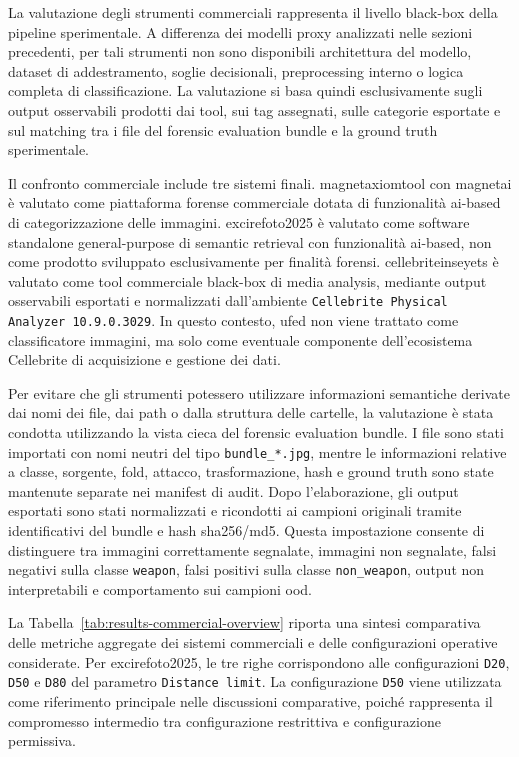 La valutazione degli strumenti commerciali rappresenta il livello black-box della
pipeline sperimentale. A differenza dei modelli proxy analizzati nelle sezioni
precedenti, per tali strumenti non sono disponibili architettura del modello,
dataset di addestramento, soglie decisionali, preprocessing interno o logica
completa di classificazione. La valutazione si basa quindi esclusivamente sugli
output osservabili prodotti dai tool, sui tag assegnati, sulle categorie esportate
e sul matching tra i file del forensic evaluation bundle e la ground truth
sperimentale.

Il confronto commerciale include tre sistemi finali. \gls{magnetaxiomtool} con
\gls{magnetai} è valutato come piattaforma forense commerciale dotata di
funzionalità \gls{ai}-based di categorizzazione delle immagini.
\gls{excirefoto2025} è valutato come software standalone general-purpose di
semantic retrieval con funzionalità \gls{ai}-based, non come prodotto sviluppato
esclusivamente per finalità forensi. \gls{cellebriteinseyets} è valutato come
tool commerciale black-box di media analysis, mediante output osservabili
esportati e normalizzati dall'ambiente \texttt{Cellebrite Physical Analyzer
10.9.0.3029}. In questo contesto, \gls{ufed} non viene trattato come
classificatore immagini, ma solo come eventuale componente dell'ecosistema
Cellebrite di acquisizione e gestione dei dati.

Per evitare che gli strumenti potessero utilizzare informazioni semantiche
derivate dai nomi dei file, dai path o dalla struttura delle cartelle, la
valutazione è stata condotta utilizzando la vista cieca del forensic evaluation
bundle. I file sono stati importati con nomi neutri del tipo
\texttt{bundle\_*.jpg}, mentre le informazioni relative a classe, sorgente, fold,
attacco, trasformazione, hash e ground truth sono state mantenute separate nei
manifest di audit. Dopo l'elaborazione, gli output esportati sono stati
normalizzati e ricondotti ai campioni originali tramite identificativi del bundle
e hash \gls{sha256}/\gls{md5}. Questa impostazione consente di distinguere tra
immagini correttamente segnalate, immagini non segnalate, falsi negativi sulla
classe \texttt{weapon}, falsi positivi sulla classe \texttt{non\_weapon}, output
non interpretabili e comportamento sui campioni \gls{ood}.

La Tabella~\ref{tab:results-commercial-overview} riporta una sintesi comparativa
delle metriche aggregate dei sistemi commerciali e delle configurazioni
operative considerate. Per \gls{excirefoto2025}, le tre righe corrispondono alle
configurazioni \texttt{D20}, \texttt{D50} e \texttt{D80} del parametro
\texttt{Distance limit}. La configurazione \texttt{D50} viene utilizzata come
riferimento principale nelle discussioni comparative, poiché rappresenta il
compromesso intermedio tra configurazione restrittiva e configurazione
permissiva.

